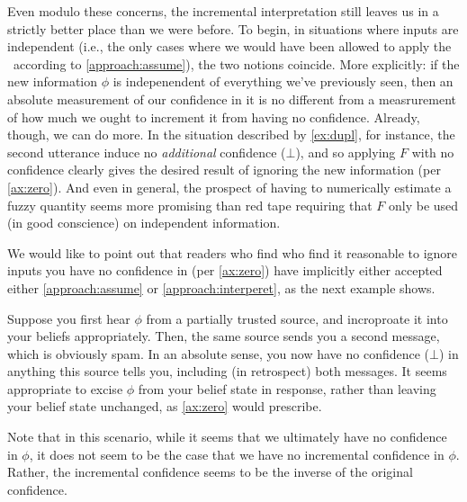 \begin{enumerate}[label={\textbf{I\arabic*.}},ref={I\arabic*}]
	Even modulo these concerns, the incremental interpretation still leaves us in a strictly better place than we were before.
	To begin, in situations where inputs are independent (i.e., the only cases where we would have been allowed to apply the \cofunc\ according to \cref{approach:assume}), the two notions coincide.
	More explicitly: if the new information $\phi$ is indepenendent of everything we've previously seen, then an absolute measurement of our confidence in it is no different from a measrurement of how much we ought to increment it from having no confidence.
	Already, though, we can do more.
	In the situation described by \cref{ex:dupl}, for instance,
	the second utterance induce no \emph{additional} confidence ($\bot$), and so applying $F$ with no confidence clearly gives the desired result of ignoring the new information (per \cref{ax:zero}).
%
%
	And even in general, the prospect of having to numerically estimate a fuzzy quantity seems more promising than red tape requiring that $F$ only be used (in good conscience) on independent information.

\end{enumerate}

We would like to point out that readers who find who find it reasonable to ignore inputs you have no confidence in (per \cref{ax:zero}) have implicitly either accepted either \cref{approach:assume} or \cref{approach:interperet}, as the next example shows. 


\begin{example}
	Suppose you first hear $\phi$ from a partially trusted source, and incroproate it into your beliefs appropriately.
	Then, the same source sends you a second message, which is obviously spam.
	In an absolute sense, you now have no confidence ($\bot$) in anything this source tells you, including (in retrospect) both messages.
	It seems appropriate to excise $\phi$ from your belief state in response, rather than leaving your belief state unchanged, as \cref{ax:zero} would prescribe.

	Note that in this scenario, while it seems that we ultimately have no confidence in $\phi$, it does not seem to be the case that we have no incremental confidence in $\phi$.
	Rather, the incremental confidence seems to be the inverse of the original confidence.
\end{example}

